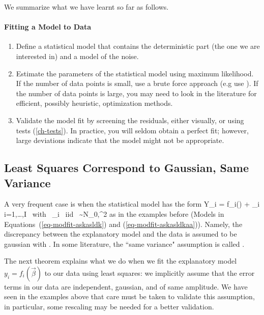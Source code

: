 We summarize what we have learnt so far as follows.

\begin{sh}
\paragraph{Fitting a Model to Data}
\begin{enumerate}
    \item Define a statistical model that contains  the
    deterministic part (the one we are interested in) and a model of
    the noise.
    \item Estimate the parameters of the statistical model using
    maximum likelihood. If the number of data points is small, use a
    brute force approach (e.g use ). If the number
    of data points is large, you may need to look in the literature
    for efficient, possibly heuristic, optimization methods.
    \item Validate the model fit by screening the residuals, either
    visually, or using tests (\cref{ch-tests}).
    In practice, you will seldom obtain a perfect
    fit; however, large deviations indicate that
    the model might not be appropriate.
\end{enumerate}
\end{sh}
\subsection{Least Squares Correspond to Gaussian, Same Variance}
\label{sec-lshomo} A very frequent case is when the statistical
model has the form
 \be
 Y_i = f_i(\vec{\beta}) + \epsilon_i \mfor i=1,\ldots,I \mbox{    with } \epsilon_i
 \mbox{ iid } \sim N_{0,\sigma^2}
 \label{eq:ls-mod}
 \ee
as in the examples before (Models in
Equations~(\ref{eq-modfit-askasldk}) and
(\ref{eq-modfit-askasldkaa})). Namely, the discrepancy between the
 explanatory model and the data is assumed to be gaussian with
 . In some
literature, the ``same variance" assumption is called
.


The next theorem explains what we do when we fit the
explanatory model $y_i= f_i(\vec{\beta})$ to our data using
least squares: we implicitly assume that the error terms in our
data are independent, gaussian, and of same amplitude. We have
seen in the examples above that care must be taken to validate
this assumption, in particular, some rescaling may be needed
for a better validation.

